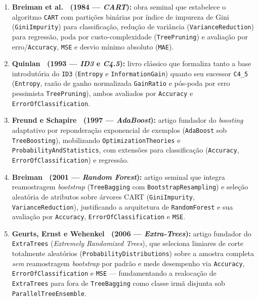 \documentclass[11pt,a4paper]{article}
\newcommand{\onto}[1]{\texttt{#1}}
\begin{document}
\begin{enumerate}[leftmargin=*,nosep]
  \item \textbf{Breiman et al.~\cite{breiman1984cart} (1984 --- \emph{CART}):} obra seminal que estabelece o algoritmo \onto{CART} com partições binárias por índice de impureza de Gini (\onto{GiniImpurity}) para classificação, redução de variância (\onto{VarianceReduction}) para regressão, poda por custo-complexidade (\onto{TreePruning}) e avaliação por erro/\onto{Accuracy}, \onto{MSE} e desvio mínimo absoluto (\onto{MAE}).
  \item \textbf{Quinlan~\cite{quinlan1993c45} (1993 --- \emph{ID3} e \emph{C4.5}):} livro clássico que formaliza tanto a base introdutória do \onto{ID3} (\onto{Entropy} e \onto{InformationGain}) quanto seu sucessor \onto{C4\_5} (\onto{Entropy}, razão de ganho normalizada \onto{GainRatio} e pós-poda por erro pessimista \onto{TreePruning}), ambos avaliados por \onto{Accuracy} e \onto{ErrorOfClassification}.
  \item \textbf{Freund e Schapire~\cite{freund1997decision} (1997 --- \emph{AdaBoost}):} artigo fundador do \emph{boosting} adaptativo por reponderação exponencial de exemplos (\onto{AdaBoost} sob \onto{TreeBoosting}), mobilizando \onto{OptimizationTheories} e \onto{ProbabilityAndStatistics}, com extensões para classificação (\onto{Accuracy}, \onto{ErrorOfClassification}) e regressão.
  \item \textbf{Breiman~\cite{breiman2001random} (2001 --- \emph{Random Forest}):} artigo seminal que integra reamostragem \emph{bootstrap} (\onto{TreeBagging} com \onto{BootstrapResampling}) e seleção aleatória de atributos sobre árvores CART (\onto{GiniImpurity}, \onto{VarianceReduction}), justificando a arquitetura de \onto{RandomForest} e sua avaliação por \onto{Accuracy}, \onto{ErrorOfClassification} e \onto{MSE}.
  \item \textbf{Geurts, Ernst e Wehenkel~\cite{geurts2006extremely} (2006 --- \emph{Extra-Trees}):} artigo fundador do \onto{ExtraTrees} (\emph{Extremely Randomized Trees}), que seleciona limiares de corte totalmente aleatórios (\onto{ProbabilityDistributions}) sobre a amostra completa \emph{sem} reamostragem \emph{bootstrap} por padrão e mede desempenho via \onto{Accuracy}, \onto{ErrorOfClassification} e \onto{MSE} --- fundamentando a realocação de \onto{ExtraTrees} para fora de \onto{TreeBagging} como classe irmã disjunta sob \onto{ParallelTreeEnsemble}.

\end{enumerate}
\end{document}
